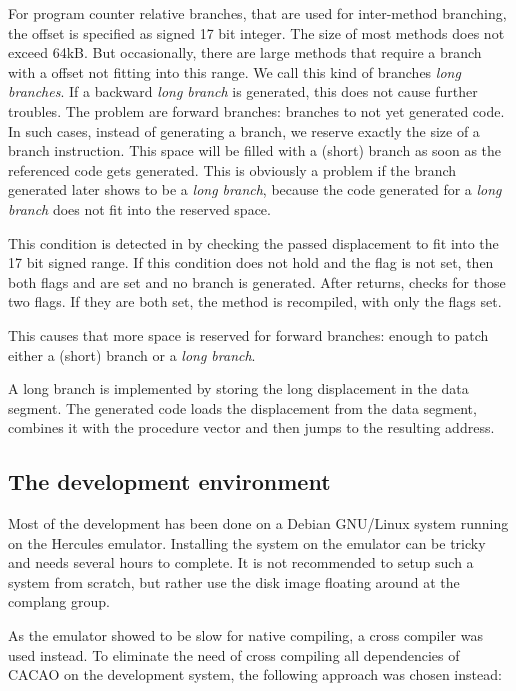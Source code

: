 For program counter relative branches, that are used for inter-method branching, the offset is specified as signed 17 bit integer. The size of most methods does not exceed 64kB. But occasionally, there are large methods that require a branch with a offset not fitting into this range. We call this kind of branches \emph{long branches}. If a backward \emph{long branch} is generated, this does not cause further troubles. The problem are forward branches: branches to not yet generated code. In such cases, instead of generating a branch, we reserve exactly the size of a branch instruction. This space will be filled with a (short) branch as soon as the referenced code gets generated. This is obviously a problem if the branch generated later shows to be a \emph{long branch}, because the code generated for a \emph{long branch} does not fit into the reserved space.

This condition is detected in  by checking the passed displacement to fit into the 17 bit signed range. If this condition does not hold and the flag  is not set, then both flags  and  are set and no branch is generated. After  returns,  checks for those two flags. If they are both set, the method is recompiled, with only the  flags set. 

This causes that more space is reserved for forward branches: enough to patch either a (short) branch or a \emph{long branch}.

A long branch is implemented by storing the long displacement in the data segment. The generated code loads the displacement from the data segment, combines it with the procedure vector and then jumps to the resulting address.

\subsection{The development environment}

Most of the development has been done on a Debian GNU/Linux system running on the Hercules emulator. Installing the system on the emulator can be tricky and needs several hours to complete. It is not recommended to setup such a system from scratch, but rather use the disk image floating around at the complang group.

As the emulator showed to be slow for native compiling, a cross compiler was used instead. To eliminate the need of cross compiling all dependencies of CACAO on the development system, the following approach was chosen instead:

